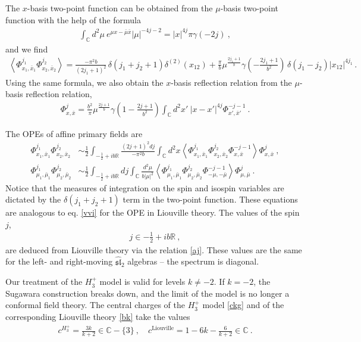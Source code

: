 \documentclass[12pt, a4paper, notitlepage, twoside]{report}
\numberwithin{equation}{section}
\theoremstyle{break}
\begin{document}
The $x$-basis two-point function can be obtained from the $\mu$-basis two-point function with the help of the formula 
\begin{align}
 \int_{{\mathbb{C}}}d^2\mu\ e^{\mu x-\bar{\mu}\bar{x}} |\mu|^{-4j-2} = |x|^{4j}\pi \gamma(-2j) \ ,
\end{align}
and we find 
\begin{align}
 \left\langle \Phi^{j_1}_{x_1,\bar{x}_1} \Phi^{j_2}_{x_2,\bar{x}_2} \right\rangle = \frac{-\pi^2 b}{(2j_1+1)^2}\, \delta(j_1+j_2+1)\delta^{(2)}(x_{12}) 
+ \frac{\pi}{b}\mu^{\frac{2j_1+1}{b}} \gamma(-\tfrac{2j_1+1}{b^2})\, \delta(j_1-j_2)|x_{12}|^{4j_1}\, .
\label{pjpj}
\end{align}
Using the same formula, we also obtain the $x$-basis reflection relation from the $\mu$-basis reflection relation,
\begin{align}
 \Phi^j_{x,\bar{x}} = \frac{b^2}{\pi}\mu^{\frac{2j+1}{b}}\gamma(1-\tfrac{2j+1}{b^2})\int_{{\mathbb{C}}}d^2x'\ |x-x'|^{4j}\Phi^{-j-1}_{x',\bar{x}'}\ .
\end{align}

The OPEs of affine primary fields are
\begin{align}
 \Phi^{j_1}_{x_1,\bar{x}_1}\Phi^{j_2}_{x_2,\bar{x}_2} &\sim \frac12 \int_{-\frac12 + ib\mathbb{R}} \frac{(2j+1)^2 dj}{-\pi^2b}\int_{{\mathbb{C}}}d^2x \left\langle \Phi^{j_1}_{x_1,\bar{x}_1}\Phi^{j_2}_{x_2,\bar{x}_2} \Phi^{-j-1}_{x,\bar{x}} \right\rangle \Phi^j_{x,\bar{x}}\ ,
\label{xope}
\\
\Phi^{j_1}_{\mu_1,\bar{\mu}_1}\Phi^{j_2}_{\mu_2,\bar{\mu}_2} &\sim \frac12 \int_{-\frac12 + ib\mathbb{R}} dj\int_{{\mathbb{C}}}\frac{d^2\mu}{b|\mu|^2} \left\langle \Phi^{j_1}_{\mu_1,\bar{\mu}_1}\Phi^{j_2}_{\mu_2,\bar{\mu}_2} \Phi^{-j-1}_{-\mu,-\bar{\mu}} \right\rangle \Phi^j_{\mu,\bar{\mu}}\ .
\label{mope}
\end{align}
Notice that the measures of integration on the spin and isospin variables are dictated by the $\delta(j_1+j_2+1)$ term in the two-point function.
These equations are analogous to eq. \eqref{vvi} for the OPE in Liouville theory.
The values of the spin $j$,
\begin{align}
 \boxed{j\in -\frac12 + ib\mathbb{R}}\ , 
\end{align}
are deduced from Liouville theory via the relation \eqref{aj}.
These values are the same for the left- and right-moving $\widehat{\mathfrak{sl}}_2$ algebras -- the spectrum is diagonal.

Our treatment of the $H_3^+$ model is valid for levels $k\neq -2$. 
If $k=-2$, the Sugawara construction breaks down, and the limit of the model is no longer a conformal field theory.
The central charges of the $H_3^+$ model \eqref{ckg} and of the corresponding Liouville theory \eqref{bk} take the values
\begin{align}
 \boxed{c^{H_3^+} = \frac{3k}{k+2} \in \mathbb{C}-\{3\}} \ , \quad c^{\text{Liouville}} = 1-6k-\frac{6}{k+2}\in \mathbb{C}\ .
\end{align} 
\end{document}
